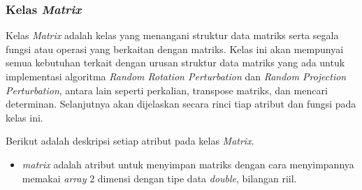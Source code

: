 \subsubsection{Kelas \textit{Matrix}}
\label{subsubsec:kelas-matrix}

Kelas \textit{Matrix} adalah kelas yang menangani struktur data matriks serta segala fungsi atau operasi yang berkaitan dengan matriks. Kelas ini akan mempunyai semua kebutuhan terkait dengan urusan struktur data matriks yang ada untuk implementasi algoritma \textit{Random Rotation Perturbation} dan \textit{Random Projection Perturbation}, antara lain seperti perkalian, transpose matriks, dan mencari determinan. Selanjutnya akan dijelaskan secara rinci tiap atribut dan fungsi pada kelas ini.

Berikut adalah deskripsi setiap atribut pada kelas \textit{Matrix}.
\begin{itemize}
	\item \textit{matrix} adalah atribut untuk menyimpan matriks dengan cara menyimpannya memakai \textit{array} 2 dimensi dengan tipe data \textit{double}, bilangan riil.
\end{itemize}

